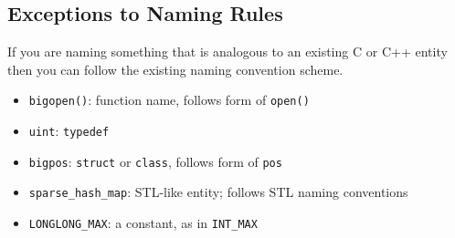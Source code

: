     \subsection{Exceptions to Naming Rules}
    If you are naming something that is analogous to an existing C or C++ entity then you can follow the existing naming convention scheme.

    \begin{itemize}
        \item \texttt{bigopen()}: function name, follows form of \texttt{open()}
        \item \texttt{uint}: \texttt{typedef}
        \item \texttt{bigpos}: \texttt{struct} or \texttt{class}, follows form of \texttt{pos}
        \item \texttt{sparse_hash_map}: STL-like entity; follows STL naming conventions
        \item \texttt{LONGLONG_MAX}: a constant, as in \texttt{INT_MAX}
    \end{itemize}











